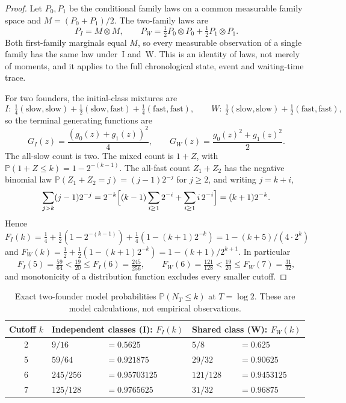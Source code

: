 \documentclass[11pt,a4paper]{article}
\theoremstyle{plain}
\theoremstyle{definition}
\theoremstyle{remark}
\newcommand{\PP}{\mathbb P}
\begin{document}
\begin{proof}
Let $P_0,P_1$ be the conditional family laws on a common measurable family space and $M=(P_0+P_1)/2$. The two-family laws are
\[
P_I=M\otimes M,\qquad P_W=\tfrac12P_0\otimes P_0+\tfrac12P_1\otimes P_1 .
\]
Both first-family marginals equal $M$, so every measurable observation of a single family has the same law under~I and~W. This is an identity of laws, not merely of moments, and it applies to the full chronological state, event and waiting-time trace.

For two founders, the initial-class mixtures are
\[
I:\ \tfrac14(\text{slow},\text{slow})+\tfrac12(\text{slow},\text{fast})+\tfrac14(\text{fast},\text{fast}),\qquad W:\ \tfrac12(\text{slow},\text{slow})+\tfrac12(\text{fast},\text{fast}),
\]
so the terminal generating functions are
\begin{equation}\label{eq:pgf}
G_I(z)=\frac{(g_0(z)+g_1(z))^2}{4},\qquad G_W(z)=\frac{g_0(z)^2+g_1(z)^2}{2}.
\end{equation}
The all-slow count is two. The mixed count is $1+Z$, with $\PP(1+Z\le k)=1-2^{-(k-1)}$. The all-fast count $Z_1+Z_2$ has the negative binomial law $\PP(Z_1+Z_2=j)=(j-1)2^{-j}$ for $j\ge2$, and writing $j=k+i$,
\[
\sum_{j>k}(j-1)2^{-j}=2^{-k}\Bigl[(k-1)\sum_{i\ge1}2^{-i}+\sum_{i\ge1}i\,2^{-i}\Bigr]=(k+1)2^{-k}.
\]
Hence $F_I(k)=\tfrac14+\tfrac12(1-2^{-(k-1)})+\tfrac14(1-(k+1)2^{-k})=1-(k+5)/(4\cdot2^k)$ and $F_W(k)=\tfrac12+\tfrac12(1-(k+1)2^{-k})=1-(k+1)/2^{k+1}$. In particular
\[
F_I(5)=\tfrac{59}{64}<\tfrac{19}{20}\le F_I(6)=\tfrac{245}{256},\qquad F_W(6)=\tfrac{121}{128}<\tfrac{19}{20}\le F_W(7)=\tfrac{31}{32},
\]
and monotonicity of a distribution function excludes every smaller cutoff.
\end{proof}

\begin{table}[t]
\centering
\caption{Exact two-founder model probabilities $\PP(N_T\le k)$ at $T=\log2$. These are model calculations, not empirical observations.}\label{tab:cdf}
\begin{tabular}{@{}cllll@{}}
\toprule
Cutoff $k$ & \multicolumn{2}{l}{Independent classes (I): $F_I(k)$} & \multicolumn{2}{l}{Shared class (W): $F_W(k)$}\\
\midrule
2 & $9/16$ & $=0.5625$ & $5/8$ & $=0.625$\\
5 & $59/64$ & $=0.921875$ & $29/32$ & $=0.90625$\\
6 & $245/256$ & $=0.95703125$ & $121/128$ & $=0.9453125$\\
7 & $125/128$ & $=0.9765625$ & $31/32$ & $=0.96875$\\
\bottomrule
\end{tabular}
\end{table}
\end{document}
